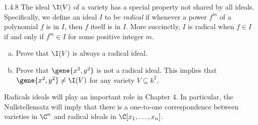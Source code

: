 \documentclass[twoside]{article}
\begin{document}
\begin{ejercicio}{1.4.8}
The ideal $\I(V)$ of a variety has a special property not shared by all ideals. Specifically, we define an ideal $I$ to be \emph{radical} if whenever a power $f^m$ of a polynomial $f$ is in $I$, then $f$ itself is in $I$. More succinctly, $I$ is radical when $f \in I$ if and only if $f^m \in I$ for some positive integer $m$.
\begin{enumerate}[a.]
\item Prove that $\I(V)$ is always a radical ideal.
\item Prove that $\gene{x^2,y^2}$ is not a radical ideal.
This implies that $\gene{x^2,y^2} \neq \I(V)$ for any variety $V \subseteq k^2$.
\end{enumerate}
Radicals ideals will play an important role in Chapter 4. In particular, the Nullstellensatz will imply that there is a one-to-one correspondence between varieties in $\C^n$ and radical ideals in $\C[x_1,\dots,x_n]$.
\end{ejercicio}
\end{document}
